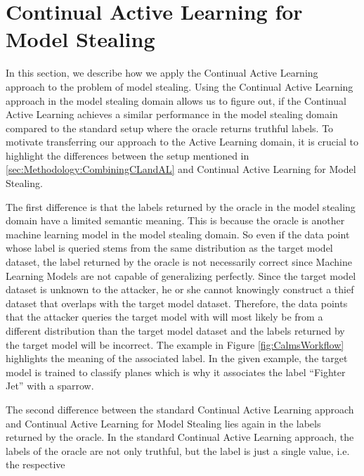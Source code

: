 \section{Continual Active Learning for Model Stealing}
\label{sec:Methodolody:CALMS}
In this section, we describe how we apply the Continual Active Learning approach to the problem of model stealing. Using the Continual Active Learning approach
in the model stealing domain allows us to figure out, if the Continual Active Learning achieves a similar performance in the model stealing domain compared to
the standard setup where the oracle returns truthful labels. To motivate transferring our approach to the Active Learning domain, it is crucial to highlight the
differences between the setup mentioned in \ref{sec:Methodology:CombiningCLandAL} and Continual Active Learning for Model Stealing. \par
The first difference is that the labels returned by the oracle in the model stealing domain have a limited semantic meaning. This is because the oracle is another
machine learning model in the model stealing domain. So even if the data point whose label is queried stems from the same distribution as the target model dataset,
the label returned by the oracle is not necessarily correct since Machine Learning Models are not capable of generalizing perfectly. Since the target model dataset
is unknown to the attacker, he or she cannot knowingly construct a thief dataset that overlaps with the target model dataset. Therefore, the data points that the
attacker queries the target model with will most likely be from a different distribution than the target model dataset and the labels returned by the target model
will be incorrect. The example in Figure \ref{fig:CalmsWorkflow} highlights the meaning of the associated label. In the given example, the target model is trained
to classify planes which is why it associates the label \enquote{Fighter Jet} with a sparrow. \par
The second difference between the standard Continual Active Learning approach and Continual Active Learning for Model Stealing lies again in the labels returned by
the oracle. In the standard Continual Active Learning approach, the labels of the oracle are not only truthful, but the label is just a single value, i.e. the respective
